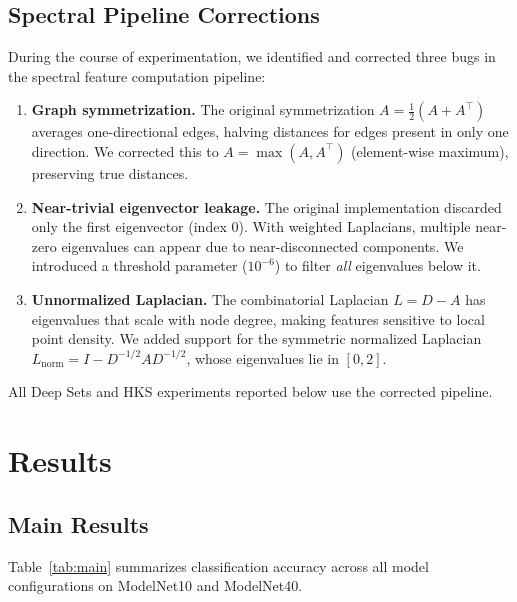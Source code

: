 \documentclass[11pt]{article}
\begin{document}
\subsection{Spectral Pipeline Corrections}

During the course of experimentation, we identified and corrected three bugs in the
spectral feature computation pipeline:

\begin{enumerate}[nosep]
    \item \textbf{Graph symmetrization.} The original symmetrization
          $A = \frac{1}{2}(A + A^\top)$ averages one-directional edges, halving distances
          for edges present in only one direction. We corrected this to
          $A = \max(A, A^\top)$ (element-wise maximum), preserving true distances.

    \item \textbf{Near-trivial eigenvector leakage.} The original implementation discarded
          only the first eigenvector (index 0). With weighted Laplacians, multiple
          near-zero eigenvalues can appear due to near-disconnected components. We
          introduced a threshold parameter ($10^{-6}$) to filter \emph{all} eigenvalues
          below it.

    \item \textbf{Unnormalized Laplacian.} The combinatorial Laplacian $L = D - A$ has
          eigenvalues that scale with node degree, making features sensitive to local
          point density. We added support for the symmetric normalized Laplacian
          $L_{\text{norm}} = I - D^{-1/2} A D^{-1/2}$, whose eigenvalues lie in $[0, 2]$.
\end{enumerate}

All Deep Sets and HKS experiments reported below use the corrected pipeline.

\section{Results}

\subsection{Main Results}

Table~\ref{tab:main} summarizes classification accuracy across all model configurations on
ModelNet10 and ModelNet40.
\end{document}
